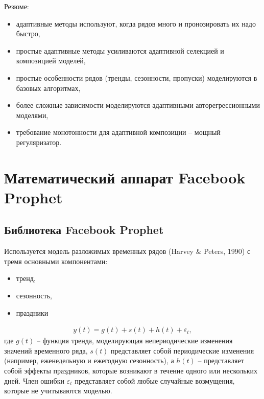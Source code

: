 \documentclass[%
	11pt,
	a4paper,
	utf8,
		]{article}
\begin{document}
Резюме:
\begin{itemize}
	\item адаптивные методы используют, когда рядов много и пронозировать их надо быстро,
	
	\item простые адаптивные методы усиливаются адаптивной селекцией и композицией моделей,
	
	\item простые особенности рядов (тренды, сезонности, пропуски) моделируются в базовых алгоритмах,
	
	\item более сложные зависимости моделируются адаптивными авторегрессионными моделями,
	
	\item требование монотонности для адаптивной композиции -- мощный регуляризатор.
\end{itemize}











\section{Математический аппарат Facebook Prophet}

\subsection{Библиотека Facebook Prophet}

Используется модель разложимых временных рядов (Harvey \& Peters, 1990) с тремя основными компонентами:
\begin{itemize}
	\item тренд,
	
	\item сезонность,
	
	\item праздники
\end{itemize}
\begin{align*}
y(t) = g(t) + s(t) + h(t) + \varepsilon_t,
\end{align*}
где $g(t)$ -- функция тренда, моделирующая непериодические изменения значений временного ряда, $s(t)$ представляет собой периодические изменения (например, еженедельную и ежегодную сезонность), а $h(t)$ -- представляет собой эффекты праздников, которые возникают в течение одного или нескольких дней. Член ошибки $\varepsilon_t$ представляет собой любые случайные возмущения, которые не учитываются моделью. 
\end{document}
